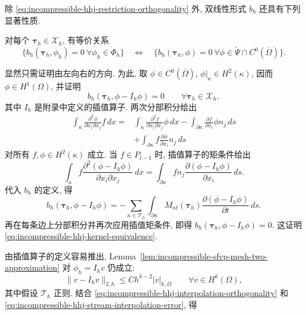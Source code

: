 除 \eqref{eq:incompressible-hhj-restriction-orthogonality} 外,
双线性形式 $b_h$ 还具有下列显著性质.

\begin{Lemma}\label{lem:incompressible-hhj-kernel-equivalence}
对每个 $\boldsymbol\tau_h\in\mathcal X_h$, 有等价关系
\begin{equation}\label{eq:incompressible-hhj-kernel-equivalence}
\{b_h(\boldsymbol\tau_h,\phi_h)=0
\ \forall\phi_h\in\Phi_h\}
\quad\Longleftrightarrow\quad
\{b_h(\boldsymbol\tau_h,\phi)=0
\ \forall\phi\in\widetilde\Psi\cap C^0(\overline\Omega)\}.
\end{equation}
\end{Lemma}

\begin{Proof}
显然只需证明由左向右的方向.
为此, 取 $\phi\in C^0(\overline\Omega)$,
$\phi|_\kappa\in H^2(\kappa)$, 因而 $\phi\in H^1(\Omega)$,
并证明
\begin{equation}\label{eq:incompressible-hhj-interpolation-orthogonality}
b_h(\boldsymbol\tau_h,\phi-I_h\phi)=0
\qquad\forall\boldsymbol\tau_h\in\mathcal X_h,
\end{equation}
其中 $I_h$ 是附录中定义的插值算子.
两次分部积分给出
\[
\begin{split}
\int_\kappa
\frac{\partial^2\phi}{\partial x_i\partial x_j}f\,dx
={}&\int_\kappa
\frac{\partial^2f}{\partial x_i\partial x_j}\phi\,dx
-\int_{\partial\kappa}
\frac{\partial f}{\partial x_i}\phi n_j\,ds\\
&+\int_{\partial\kappa}
f\frac{\partial\phi}{\partial x_i}n_j\,ds
\end{split}
\]
对所有 $f,\phi\in H^2(\kappa)$ 成立.
当 $f\in P_{l-1}$ 时, 插值算子的矩条件给出
\[
\int_\kappa f
\frac{\partial^2(\phi-I_h\phi)}{\partial x_i\partial x_j}\,dx
=\int_{\partial\kappa}fn_j
\frac{\partial(\phi-I_h\phi)}{\partial x_i}\,ds.
\]
代入 $b_h$ 的定义, 得
\[
b_h(\boldsymbol\tau_h,\phi-I_h\phi)
=-\sum_{\kappa\in\mathcal T_h}
\int_{\partial\kappa}M_{nt}(\boldsymbol\tau_h)
\frac{\partial(\phi-I_h\phi)}{\partial t}\,ds.
\]
再在每条边上分部积分并再次应用插值矩条件,
即得 $b_h(\boldsymbol\tau_h,\phi-I_h\phi)=0$.
这证明 \eqref{eq:incompressible-hhj-kernel-equivalence}.
\end{Proof}

由插值算子的定义容易推出,
Lemma~\ref{lem:incompressible-sfvp-mesh-two-approximation}
对 $\phi_h=I_hv$ 仍成立:
\begin{equation}\label{eq:incompressible-hhj-stream-interpolation-error}
\|v-I_hv\|_{2,h}
\leq Ch^{k-2}|v|_{k,\Omega}
\qquad\forall v\in H^k(\Omega),
\end{equation}
其中假设 $\mathcal T_h$ 正则.
结合 \eqref{eq:incompressible-hhj-interpolation-orthogonality}
和 \eqref{eq:incompressible-hhj-stream-interpolation-error}, 得


